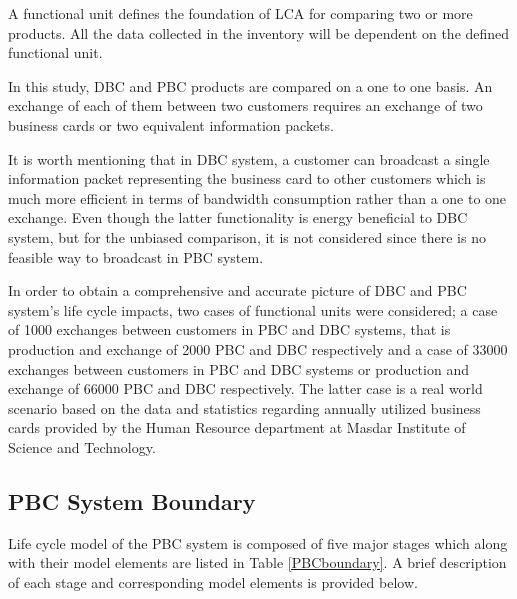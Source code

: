 \documentclass[conference]{IEEEtran}
\begin{document}
A functional unit defines the foundation of LCA for comparing two or more products. All the data collected in the inventory will be dependent on the defined functional unit.

In this study, DBC and PBC products are compared on a one to one basis. An exchange of each of them between two customers requires an exchange of two business cards or two equivalent information packets. 

It is worth mentioning that in DBC system, a customer can broadcast a single information packet representing the business card to other customers which is much more efficient in terms of bandwidth consumption rather than a one to one exchange. Even though the latter functionality is energy beneficial to DBC system, but for the unbiased comparison, it is not considered since there is no feasible way to broadcast in PBC system.

In order to obtain a comprehensive and accurate picture of DBC and PBC system's life cycle impacts, two cases of functional units were considered; a case of 1000 exchanges between customers in PBC and DBC systems, that is production and exchange of 2000 PBC and DBC respectively and a case of 33000 exchanges between customers in PBC and DBC systems or production and exchange of 66000 PBC and DBC respectively. The latter case is a real world scenario based on the data and statistics regarding annually utilized business cards provided by the Human Resource department at Masdar Institute of Science and Technology.  


\subsection{PBC System Boundary} \label{PBCBoundary}
Life cycle model of the PBC system is composed of five major stages which along with their model elements are listed in Table \ref{PBCboundary}. A brief description of each stage and corresponding model elements is provided below.
\end{document}
